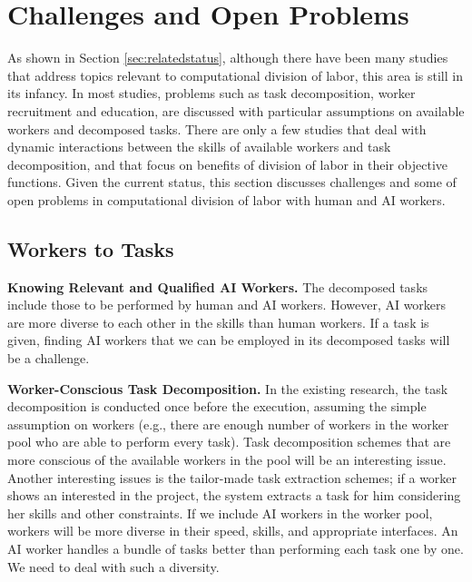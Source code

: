 
%

\section{Challenges and Open Problems}
\label{sec:challenges}

As shown in Section \ref{sec:relatedstatus}, although there have been many studies that  address topics relevant to computational division of labor, this area is still in its infancy. 
In most studies, problems such as  task decomposition, worker recruitment and education, are discussed with particular assumptions on available workers and decomposed tasks.
There are only a few studies that  deal with dynamic interactions between the skills of available workers and task decomposition, and that focus on benefits of division of labor in their objective functions.
Given the current status, this section discusses challenges and some of open problems in computational division of labor with human and AI workers.


\subsection{Workers to Tasks}

{\bf Knowing Relevant and Qualified AI Workers.}
The decomposed tasks include those to be performed by human and AI workers. However, AI workers are more diverse to each other in the skills than human workers. If a task is given, finding AI workers that we can be employed in its decomposed tasks will be a challenge.   

\noindent
{\bf Worker-Conscious Task Decomposition.}
In the existing research, the task decomposition is conducted once before the execution, assuming the simple assumption on workers (e.g., there are enough number of workers in the worker pool who are able to perform every task). 
Task decomposition schemes that are more conscious of the available workers in the pool will be an interesting issue. Another interesting issues is the tailor-made task extraction schemes; if a worker shows an interested in the project, the system extracts a task for him considering her skills and other constraints.
If we include AI workers in the worker pool, workers will be more diverse in their speed, skills, and appropriate interfaces. An AI worker handles a bundle of tasks better than performing each task one by one. We need to deal with such a diversity.

